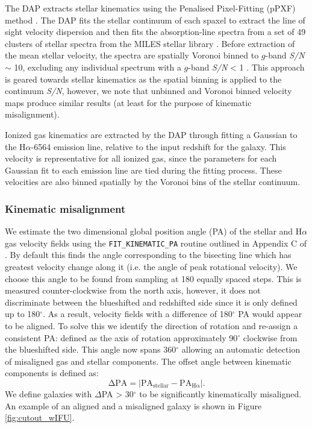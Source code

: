 The DAP extracts stellar kinematics using the Penalised Pixel-Fitting (pPXF) method \citep{cappellari2004,cappellari2017}. The DAP fits the stellar continuum of each spaxel to extract the line of sight velocity dispersion and then fits the absorption-line spectra from a set of 49 clusters of stellar spectra from the MILES stellar library \citep{sanchez2006,falcon2011}. Before extraction of the mean stellar velocity, the spectra are spatially Voronoi binned to $g$-band \textit{S/N} $\sim$ 10, excluding any individual spectrum with a $g$-band \textit{S/N} < 1 \citep{cappellari2003}. This approach is geared towards stellar kinematics as the spatial binning is applied to the continuum \textit{S/N}, however, we note that unbinned and Voronoi binned velocity maps produce similar results (at least for the purpose of kinematic misalignment). 

Ionized gas kinematics are extracted by the DAP through fitting a Gaussian to the H$\alpha$-6564 emission line, relative to the input redshift for the galaxy. This velocity is representative for all ionized gas, since the parameters for each Gaussian fit to each emission line are tied during the fitting process. These velocities are also binned spatially by the Voronoi bins of the stellar continuum. 

\subsubsection{Kinematic misalignment} \label{sec:kin_mis}
We estimate the two dimensional global position angle (PA) of the stellar and H$\alpha$ gas velocity fields using the \texttt{FIT\_KINEMATIC\_PA} routine outlined in Appendix C of \citet{krajnovic2006}. By default this finds the angle corresponding to the bisecting line which has greatest velocity change along it (i.e. the angle of peak rotational velocity). We choose this angle to be found from sampling at 180 equally spaced steps. This is measured counter-clockwise from the north axis, however, it does not discriminate between the blueshifted and redshifted side since it is only defined up to 180$^{\circ}$. As a result, velocity fields with a difference of 180$^{\circ}$ PA would appear to be aligned. To solve this we identify the direction of rotation and re-assign a consistent PA: defined as the axis of rotation approximately 90$^{\circ}$ clockwise from the blueshifted side. This angle now spans 360$^{\circ}$ allowing an automatic detection of misaligned gas and stellar components. The offset angle between kinematic components is defined as: 
\begin{equation} \label{eq:delPA}
\mathrm{\Delta PA = |PA_{stellar} - PA_{H\alpha}|. }
\end{equation}
We define galaxies with $\Delta$PA > 30$^{\circ}$ to be significantly kinematically misaligned. An example of an aligned and a misaligned galaxy is shown in Figure \ref{fig:cutout_wIFU}. 

